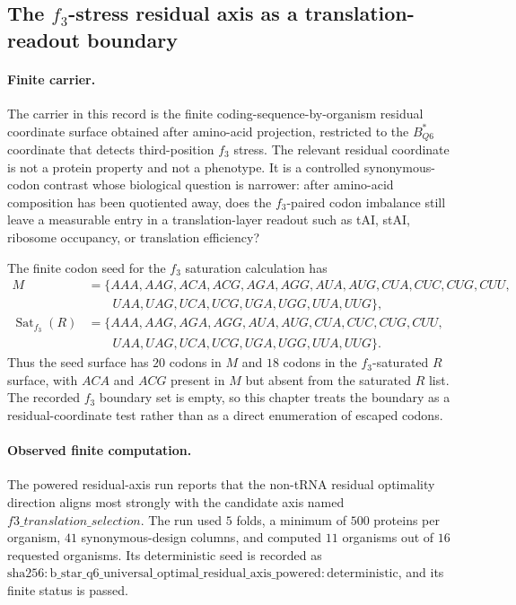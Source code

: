 \subsection{The $f_3$-stress residual axis as a translation-readout boundary}
\label{sec:bior- q6-f3-stress-translation-readout-boundary}

\paragraph{Finite carrier.}
The carrier in this record is the finite coding-sequence-by-organism residual coordinate surface obtained after amino-acid projection, restricted to the $B^{\ast}_{Q6}$ coordinate that detects third-position $f_3$ stress. The relevant residual coordinate is not a protein property and not a phenotype. It is a controlled synonymous-codon contrast whose biological question is narrower: after amino-acid composition has been quotiented away, does the $f_3$-paired codon imbalance still leave a measurable entry in a translation-layer readout such as tAI, stAI, ribosome occupancy, or translation efficiency?

The finite codon seed for the $f_3$ saturation calculation has
$$
\begin{aligned}
M &= \{AAA,AAG,ACA,ACG,AGA,AGG,AUA,AUG,CUA,CUC,CUG,CUU,\\
&\qquad UAA,UAG,UCA,UCG,UGA,UGG,UUA,UUG\},\\
\operatorname{Sat}_{f_3}(R) &= \{AAA,AAG,AGA,AGG,AUA,AUG,CUA,CUC,CUG,CUU,\\
&\qquad UAA,UAG,UCA,UCG,UGA,UGG,UUA,UUG\}.
\end{aligned}
$$
Thus the seed surface has $20$ codons in $M$ and $18$ codons in the $f_3$-saturated $R$ surface, with $ACA$ and $ACG$ present in $M$ but absent from the saturated $R$ list. The recorded $f_3$ boundary set is empty, so this chapter treats the boundary as a residual-coordinate test rather than as a direct enumeration of escaped codons.

\paragraph{Observed finite computation.}
The powered residual-axis run reports that the non-tRNA residual optimality direction aligns most strongly with the candidate axis named $f3\_translation\_selection$. The run used $5$ folds, a minimum of $500$ proteins per organism, $41$ synonymous-design columns, and computed $11$ organisms out of $16$ requested organisms. Its deterministic seed is recorded as $\mathrm{sha256{:}b\_star\_q6\_universal\_optimal\_residual\_axis\_powered{:}deterministic}$, and its finite status is passed.

